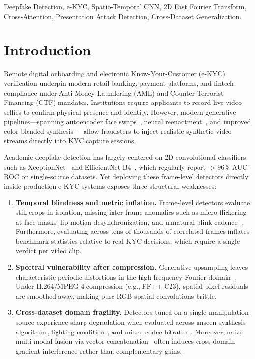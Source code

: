 \documentclass[conference,10pt]{IEEEtran}
\begin{document}
\begin{IEEEkeywords}
Deepfake Detection, e-KYC, Spatio-Temporal CNN, 2D Fast Fourier Transform, Cross-Attention, Presentation Attack Detection, Cross-Dataset Generalization.
\end{IEEEkeywords}

\section{Introduction}

Remote digital onboarding and electronic Know-Your-Customer (e-KYC) verification underpin modern retail banking, payment platforms, and fintech compliance under Anti-Money Laundering (AML) and Counter-Terrorist Financing (CTF) mandates. Institutions require applicants to record live video selfies to confirm physical presence and identity. However, modern generative pipelines---spanning autoencoder face swaps~\cite{roessler2019faceforensics}, neural reenactment~\cite{thies2016face2face,thies2019deferred}, and improved color-blended synthesis~\cite{li2020celeb}---allow fraudsters to inject realistic synthetic video streams directly into KYC capture sessions.

Academic deepfake detection has largely centered on 2D convolutional classifiers such as XceptionNet~\cite{chollet2017xception} and EfficientNet-B4~\cite{tan2019efficientnet}, which regularly report $>96\%$ AUC-ROC on single-source datasets. Yet deploying these frame-level detectors directly inside production e-KYC systems exposes three structural weaknesses:

\begin{enumerate}[leftmargin=*]
    \item \textbf{Temporal blindness and metric inflation.} Frame-level detectors evaluate still crops in isolation, missing inter-frame anomalies such as micro-flickering at face masks, lip-motion desynchronization, and unnatural blink cadence~\cite{li2018ictu}. Furthermore, evaluating across tens of thousands of correlated frames inflates benchmark statistics relative to real KYC decisions, which require a single verdict per video clip.

    \item \textbf{Spectral vulnerability after compression.} Generative upsampling leaves characteristic periodic distortions in the high-frequency Fourier domain~\cite{frank2020leveraging,durall2020watch}. Under H.264/MPEG-4 compression (e.g., FF++ C23), spatial pixel residuals are smoothed away, making pure RGB spatial convolutions brittle.

    \item \textbf{Cross-dataset domain fragility.} Detectors tuned on a single manipulation source experience sharp degradation when evaluated across unseen synthesis algorithms, lighting conditions, and mixed codec bitrates~\cite{li2020celeb}. Moreover, naive multi-modal fusion via vector concatenation~\cite{masi2020two} often induces cross-domain gradient interference rather than complementary gains.
\end{enumerate}
\end{document}
